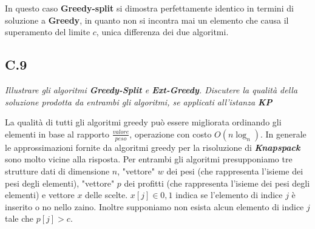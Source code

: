 \documentclass[a4paper]{article}
\newcommand{\imp}[1]{\textbf{\textit{#1}}}
\begin{document}
In questo caso \textbf{Greedy-split} si dimostra perfettamente identico in termini di soluzione a \textbf{Greedy}, in quanto non si incontra mai un elemento che causa il superamento del limite $c$, unica differenza dei due algoritmi.
\subsection{C.9}
\emph{Illustrare gli algoritmi \textbf{Greedy-Split} e \textbf{Ext-Greedy}. Discutere la qualità della soluzione prodotta da entrambi gli algoritmi, se applicati all’istanza \textbf{KP}}


La qualità di tutti gli algoritmi greedy può essere migliorata ordinando gli elementi in base al rapporto $\frac{valore}{peso}$, operazione con costo $O(n\log_n)$.
In generale le approssimazioni fornite da algoritmi greedy per la risoluzione di \imp{Knapspack} sono molto vicine alla risposta. %
Per entrambi gli algoritmi presupponiamo tre strutture dati di dimensione $n$, "vettore" $w$ dei pesi (che rappresenta l'isieme dei pesi degli elementi), "vettore" $p$ dei profitti  (che rappresenta l'isieme dei pesi degli elementi) e vettore $x$ delle scelte. $x[j] \in {0,1}$ indica se l'elemento di indice $j$ è inserito o no nello zaino.
Inoltre supponiamo non esista alcun elemento di indice $j$ tale che $p[j] > c$.
\end{document}
